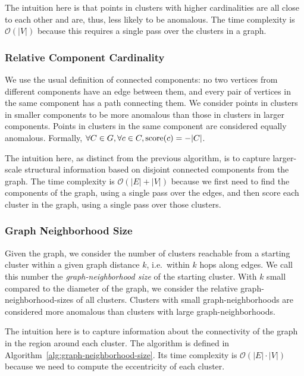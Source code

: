 The intuition here is that points in clusters with higher cardinalities are all close to each other and are, thus, less likely to be anomalous.
The time complexity is $\mathcal{O}(|V|)$ because this requires a single pass over the clusters in a graph.


\subsubsection{Relative Component Cardinality}
\label{subsubsec:methods:individual-algorithms:relative-component-cardinality}
We use the usual definition of connected components:
no two vertices from different components have an edge between them, and
every pair of vertices in the same component has a path connecting them.
We consider points in clusters in smaller components to be more anomalous than those in clusters in larger components.
Points in clusters in the same component are considered equally anomalous.
Formally, $\forall C \in G, \forall c \in C, \operatorname{score}(c) = -|C|$.

The intuition here, as distinct from the previous algorithm, is to capture larger-scale structural information based on disjoint connected components from the graph.
The time complexity is $\mathcal{O}(|E| + |V|)$ because we first need to find the components of the graph, using a single pass over the edges, and then score each cluster in the graph, using a single pass over those clusters.


\subsubsection{Graph Neighborhood Size}
\label{subsubsec:methods:individual-algorithms:graph-neighborhood-size}
Given the graph, we consider the number of clusters reachable from a starting cluster within a given graph distance $k$, i.e.\ within $k$ hops along edges.
We call this number the \textit{graph-neighborhood size} of the starting cluster.
With $k$ small compared to the diameter of the graph, we consider the relative graph-neighborhood-sizes of all clusters.
Clusters with small graph-neighborhoods are considered more anomalous than clusters with large graph-neighborhoods.

The intuition here is to capture information about the connectivity of the graph in the region around each cluster.
The algorithm is defined in Algorithm~\ref{alg:graph-neighborhood-size}.
Its time complexity is $\mathcal{O}(|E| \cdot |V|)$ because we need to compute the eccentricity of each cluster.

